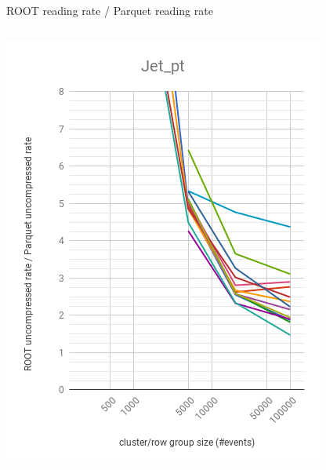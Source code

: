 \documentclass[aspectratio=169]{beamer}
\begin{document}
\begin{frame}{ROOT reading rate / Parquet reading rate}
\begin{columns}
\begin{center}
\includegraphics[width=\linewidth]{root-none-parquet-none-Jet_pt.png}
\end{center}
\begin{center}

\end{center}
\end{columns}
\end{frame}
\end{document}
